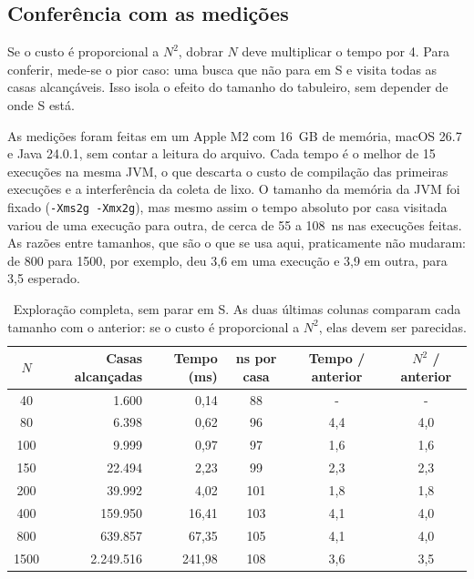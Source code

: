 \subsection{Conferência com as medições}
\label{sec:medicoes}

Se o custo é proporcional a $N^2$, dobrar $N$ deve multiplicar o tempo por 4. Para conferir,
mede-se o pior caso: uma busca que não para em S e visita todas as casas alcançáveis. Isso
isola o efeito do tamanho do tabuleiro, sem depender de onde S está.

As medições foram feitas em um Apple M2 com 16~GB de memória, macOS 26.7 e Java 24.0.1, sem contar a
leitura do arquivo. Cada tempo é o melhor de 15 execuções na mesma JVM, o que descarta o custo de
compilação das primeiras execuções e a interferência da coleta de lixo. O tamanho da
memória da JVM foi fixado (\texttt{-Xms2g -Xmx2g}), mas mesmo assim o tempo absoluto por casa
visitada variou de uma execução para outra, de cerca de 55 a 108~ns nas execuções feitas. As
razões entre tamanhos, que são o que se usa aqui, praticamente não mudaram: de 800 para 1500,
por exemplo, deu 3,6 em uma execução e 3,9 em outra, para 3,5 esperado.

\begin{table}[ht]
  \centering
  \caption{Exploração completa, sem parar em S. As duas últimas colunas comparam cada tamanho
  com o anterior: se o custo é proporcional a $N^2$, elas devem ser parecidas.}
  \label{tab:crescimento}
  \small
  \begin{tabular}{|c|r|r|c|c|c|}
    \hline
    \textbf{$N$} & \textbf{Casas alcançadas} & \textbf{Tempo (ms)} & \textbf{ns por casa}
      & \textbf{Tempo / anterior} & \textbf{$N^2$ / anterior}\\
    \hline
    40 & 1.600 & 0,14 & 88 & - & -\\
    \hline
    80 & 6.398 & 0,62 & 96 & 4,4 & 4,0\\
    \hline
    100 & 9.999 & 0,97 & 97 & 1,6 & 1,6\\
    \hline
    150 & 22.494 & 2,23 & 99 & 2,3 & 2,3\\
    \hline
    200 & 39.992 & 4,02 & 101 & 1,8 & 1,8\\
    \hline
    400 & 159.950 & 16,41 & 103 & 4,1 & 4,0\\
    \hline
    800 & 639.857 & 67,35 & 105 & 4,1 & 4,0\\
    \hline
    1500 & 2.249.516 & 241,98 & 108 & 3,6 & 3,5\\
    \hline
  \end{tabular}
\end{table}

